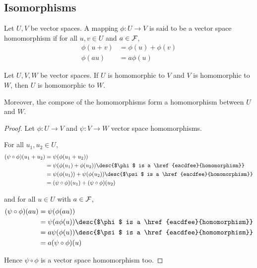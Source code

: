 \subsection{Isomorphisms}\label{b5f1f8a}

\label{eacdfee}

Let $U,V$ be vector spaces. A mapping $\phi:U\to V$ is said to be a vector
space homomorphism if for all $u,v\in U$ and $a\in\mathcal F$,
\begin{align*}
  \phi(u+v) &=\phi(u)+\phi(v) \\
  \phi(au)  &=a\phi(u)
\end{align*}

\label{ad9a353}

Let $U,V,W$ be vector spaces. If $U$ is homomorphic to $V$ and $V$ is
homomorphic to $W$, then $U$ is homomorphic to $W$.

Moreover, the compose of the homomorphisms form a homomorphism between $U$ and
$W$.

\begin{proof}
  Let $\phi:U\to V$ and $\psi:V\to W$ vector space homomorphisms.

  For all $u_1,u_2\in U$,
  \begin{align*}
    (\psi\circ\phi)(u_1+u_2)
     &=\psi(\phi(u_1+u_2))                                                            \\
     &=\psi(\phi(u_1)+\phi(u_2))\desc{$\phi$ is a \href{eacdfee}{homomorphism}}       \\
     &=\psi(\phi(u_1))+\psi(\phi(u_2))\desc{$\psi$ is a \href{eacdfee}{homomorphism}} \\
     &=(\psi\circ\phi)(u_1)+(\psi\circ\phi)(u_2)
  \end{align*}

  and for all $u\in U$ with $a\in\mathcal F$,
  \begin{align*}
    (\psi\circ\phi)(au)
     &=\psi(\phi(au))                                                \\
     &=\psi(a\phi(u))\desc{$\phi$ is a \href{eacdfee}{homomorphism}} \\
     &=a\psi(\phi(u))\desc{$\psi$ is a \href{eacdfee}{homomorphism}} \\
     &=a(\psi\circ\phi)(u)
  \end{align*}

  Hence $\psi\circ\phi$ is a vector space homomorphism too.
\end{proof}

